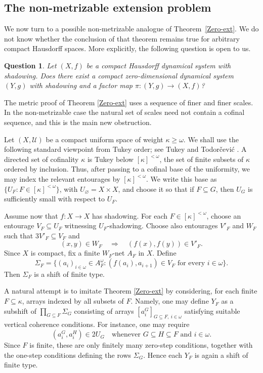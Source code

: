 \documentclass[10pt,a4paper]{amsart}
\newtheorem{question}[theorem]{Question}
\numberwithin{equation}{section}
\def\U{{\mathcal{U}}}
\def\U{{\mathcal{U}}}
\begin{document}
\subsection{The non-metrizable extension problem}

We now turn to a possible non-metrizable analogue of
Theorem~\ref{Zero-ext}.
 We do not know whether the conclusion of that theorem
remains true for arbitrary compact Hausdorff spaces. More explicitly, the
following question is open to us.

\begin{question}\label{q:nonmetric_zero_ext}
Let $(X,f)$ be a compact Hausdorff dynamical system with shadowing. Does there
exist a compact zero-dimensional dynamical system $(Y,g)$ with shadowing and a
factor map $\pi:(Y,g)\to (X,f)$?
\end{question}

The metric proof of Theorem \ref{Zero-ext} uses a sequence of finer and finer
scales. In the non-metrizable case the natural set of scales need not contain a
cofinal sequence, and this is the main new obstruction.

Let $(X,\U)$ be a compact uniform space of weight
$\kappa\geq\omega$. We shall use the following standard viewpoint from Tukey
order; see Tukey \cite{Tukey} and
Todor\v{c}evi\'c \cite{Todorcevic}. A directed set of cofinality $\kappa$ is Tukey below
$[\kappa]^{<\omega}$, the set of finite subsets of $\kappa$ ordered by
inclusion. Thus, after passing to a cofinal base of the uniformity, we may index
the relevant entourages by $[\kappa]^{<\omega}$. We write this base as
$\{U_F:F\in[\kappa]^{<\omega}\}$, with $U_\varnothing=X\times X$, and choose it
so that if $F\subseteq G$, then $U_G$ is sufficiently small with respect to
$U_F$.

Assume now that $f:X\to X$ has shadowing. For each
$F\in[\kappa]^{<\omega}$, choose an entourage $V_F\subseteq U_F$ witnessing
$U_F$-shadowing. Choose also entourages $V'_F$ and $W_F$ such that
$3V'_F\subseteq V_F$ and
\[
    (x,y)\in W_F \quad\Longrightarrow\quad (f(x),f(y))\in V'_F.
\]
Since $X$ is compact, fix a finite $W_F$-net $A_F$ in $X$. Define
\[
    \Sigma_F=\{(a_i)_{i\in\omega}\in A_F^\omega:
    (f(a_i),a_{i+1})\in V_F\text{ for every }i\in\omega\}.
\]
Then $\Sigma_F$ is a shift of finite type.

A natural attempt is to imitate Theorem \ref{Zero-ext} by considering, for each
finite $F\subseteq\kappa$, arrays indexed by all subsets of $F$. Namely, one
may define $Y_F$ as a subshift of $\prod_{G\subseteq F}\Sigma_G$ consisting of
arrays $[a_i^G]_{G\subseteq F,\ i\in\omega}$ satisfying suitable vertical
coherence conditions. For instance, one may require
\[
    (a_i^G,a_i^H)\in 2U_G
    \quad\text{whenever }G\subseteq H\subseteq F\text{ and }i\in\omega.
\]
Since $F$ is finite, these are only finitely many zero-step conditions, together
with the one-step conditions defining the rows $\Sigma_G$. Hence each $Y_F$ is
again a shift of finite type.
\end{document}
